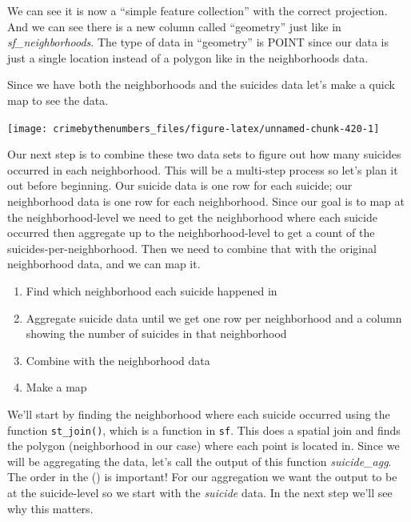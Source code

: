 \documentclass[
  a4paper,
]{krantz}
\makeatletter
\newenvironment{Shaded}{\begin{snugshade}}{\end{snugshade}}
\newcommand{\AttributeTok}[1]{\textcolor[rgb]{0.77,0.63,0.00}{#1}}
\newcommand{\ConstantTok}[1]{\textcolor[rgb]{0.00,0.00,0.00}{#1}}
\newcommand{\FunctionTok}[1]{\textcolor[rgb]{0.00,0.00,0.00}{#1}}
\newcommand{\NormalTok}[1]{#1}
\newcommand{\SpecialCharTok}[1]{\textcolor[rgb]{0.00,0.00,0.00}{#1}}
\newcommand{\StringTok}[1]{\textcolor[rgb]{0.31,0.60,0.02}{#1}}
\providecommand{\tightlist}{%
  \setlength{\itemsep}{0pt}\setlength{\parskip}{0pt}}
\newenvironment{kframe}{%
\medskip{}
\setlength{\fboxsep}{.8em}
 \def\at@end@of@kframe{}%
 \ifinner\ifhmode%
  \def\at@end@of@kframe{\end{minipage}}%
  \begin{minipage}{\columnwidth}%
 \fi\fi%
 \def\FrameCommand##1{\hskip\@totalleftmargin \hskip-\fboxsep
 \colorbox{shadecolor}{##1}\hskip-\fboxsep
     \hskip-\linewidth \hskip-\@totalleftmargin \hskip\columnwidth}%
 \MakeFramed {\advance\hsize-\width
   \@totalleftmargin\z@ \linewidth\hsize
   \@setminipage}}%
 {\par\unskip\endMakeFramed%
 \at@end@of@kframe}
\renewenvironment{Shaded}{\begin{kframe}}{\end{kframe}}
\makeatother
\begin{document}
We can see it is now a ``simple feature collection'' with
the correct projection. And we can see there is a new column
called ``geometry'' just like in \emph{sf\_neighborhoods}.
The type of data in ``geometry'' is POINT since our data is
just a single location instead of a polygon like in the
neighborhoods data.

Since we have both the neighborhoods and the suicides data
let's make a quick map to see the data.

\begin{Shaded}
\end{Shaded}

\begin{center}\texttt{[image: crimebythenumbers\_files/figure-latex/unnamed-chunk-420-1]} \end{center}

Our next step is to combine these two data sets to figure
out how many suicides occurred in each neighborhood. This
will be a multi-step process so let's plan it out before
beginning. Our suicide data is one row for each suicide; our
neighborhood data is one row for each neighborhood. Since
our goal is to map at the neighborhood-level we need to get
the neighborhood where each suicide occurred then aggregate
up to the neighborhood-level to get a count of the
suicides-per-neighborhood. Then we need to combine that with
the original neighborhood data, and we can map it.

\begin{enumerate}
\def\labelenumi{\arabic{enumi}.}
\tightlist
\item
  Find which neighborhood each suicide happened in
\item
  Aggregate suicide data until we get one row per
  neighborhood and a column showing the number of suicides
  in that neighborhood
\item
  Combine with the neighborhood data
\item
  Make a map
\end{enumerate}

We'll start by finding the neighborhood where each suicide
occurred using the function \texttt{st\_join()}, which is a
function in \texttt{sf}. This does a spatial join and finds
the polygon (neighborhood in our case) where each point is
located in. Since we will be aggregating the data, let's
call the output of this function \emph{suicide\_agg}. The
order in the () is important! For our aggregation we want
the output to be at the suicide-level so we start with the
\emph{suicide} data. In the next step we'll see why this
matters.
\end{document}
